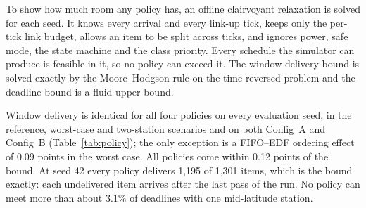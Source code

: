 \documentclass[preprint,12pt]{elsarticle}
\newcommand{\cfgA}{Config~A}
\newcommand{\cfgB}{Config~B}
\begin{document}
To show how much room any policy has, an offline clairvoyant relaxation is solved for each seed. It knows every arrival and every link-up tick, keeps only the per-tick link budget, allows an item to be split across ticks, and ignores power, safe mode, the state machine and the class priority. Every schedule the simulator can produce is feasible in it, so no policy can exceed it. The window-delivery bound is solved exactly by the Moore--Hodgson rule on the time-reversed problem and the deadline bound is a fluid upper bound.

\begin{table}[t]
\centering
\small
\caption{Policy comparison, \cfgA{}, reference scenario, mean over evaluation seeds 6000--6019 with 95\% bootstrap intervals.}
\label{tab:policy}
\end{table}

Window delivery is identical for all four policies on every evaluation seed, in the reference, worst-case and two-station scenarios and on both \cfgA{} and \cfgB{} (Table~\ref{tab:policy}); the only exception is a FIFO--EDF ordering effect of 0.09 points in the worst case. All policies come within 0.12 points of the bound. At seed 42 every policy delivers 1,195 of 1,301 items, which is the bound exactly: each undelivered item arrives after the last pass of the run. No policy can meet more than about 3.1\% of deadlines with one mid-latitude station.
\end{document}
